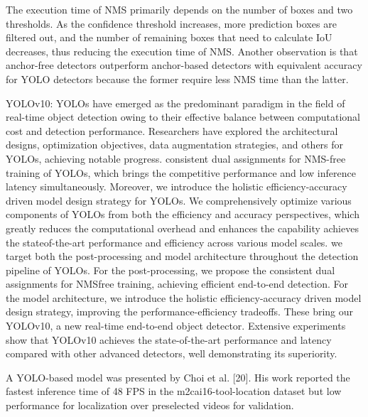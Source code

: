 The execution time of NMS primarily depends on the number of boxes and two thresholds. As the confidence threshold increases, more prediction boxes are filtered out, and the number of remaining boxes that need to calculate IoU decreases, thus reducing the execution time of NMS. Another observation is that anchor-free detectors outperform anchor-based detectors with equivalent accuracy for YOLO detectors because the former require less NMS time than the latter.

YOLOv10: YOLOs have emerged as the predominant paradigm in the field of real-time object detection owing to their effective balance between computational cost and detection performance. Researchers have explored the architectural designs, optimization objectives, data augmentation strategies, and others for YOLOs, achieving notable progress. consistent dual assignments for NMS-free training of YOLOs, which brings the competitive performance and low inference latency simultaneously. Moreover, we introduce the holistic efficiency-accuracy driven model design strategy for YOLOs. We comprehensively optimize various components of YOLOs from both the efficiency and accuracy perspectives, which greatly reduces the computational overhead and enhances the capability achieves the stateof-the-art performance and efficiency across various model scales.
we target both the post-processing and model architecture throughout the detection pipeline of YOLOs. For the post-processing, we propose the consistent dual assignments for NMSfree training, achieving efficient end-to-end detection. For the model architecture, we introduce the holistic efficiency-accuracy driven model design strategy, improving the performance-efficiency tradeoffs. These bring our YOLOv10, a new real-time end-to-end object detector. Extensive experiments show that YOLOv10 achieves the state-of-the-art performance and latency compared with other advanced detectors, well demonstrating its superiority. 

A YOLO-based model was presented by Choi et al. [20]. His work reported the fastest inference time of 48 FPS in the m2cai16-tool-location dataset but low performance for localization over preselected videos for validation. 

